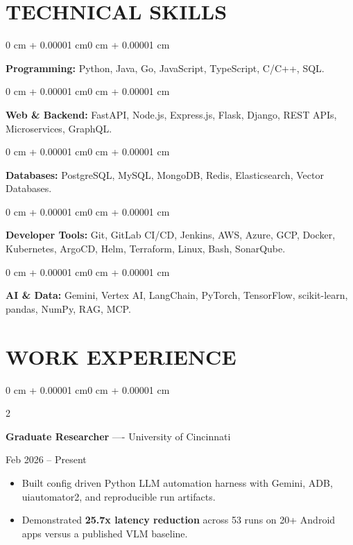 \documentclass[10pt, letterpaper]{article}
\newenvironment{highlights}{
    \begin{itemize}[
        topsep=0.10 cm,
        parsep=0.06 cm,
        partopsep=0pt,
        itemsep=0.06 cm,
        leftmargin=12pt
    ]
}{
    \end{itemize}
}
\newenvironment{onecolentry}{
    \begin{adjustwidth}{0 cm + 0.00001 cm}{0 cm + 0.00001 cm}
}{
    \end{adjustwidth}
}
\newenvironment{twocolentry}[2][]{
    \onecolentry
    \def\secondColumn{#2}
    \setcolumnwidth{\fill, 4.5 cm}
    \begin{paracol}{2}
}{
    \switchcolumn \raggedleft \secondColumn
    \end{paracol}
    \endonecolentry
}
\begin{document}
\section{TECHNICAL SKILLS}
\begin{onecolentry}
\textbf{Programming:} Python, Java, Go, JavaScript, TypeScript, C/C++, SQL.
\end{onecolentry}
\vspace{0.06 cm}
\begin{onecolentry}
\textbf{Web \& Backend:} FastAPI, Node.js, Express.js, Flask, Django, REST APIs, Microservices, GraphQL.
\end{onecolentry}
\vspace{0.06 cm}
\begin{onecolentry}
\textbf{Databases:} PostgreSQL, MySQL, MongoDB, Redis, Elasticsearch, Vector Databases.
\end{onecolentry}
\vspace{0.06 cm}
\begin{onecolentry}
\textbf{Developer Tools:} Git, GitLab CI/CD, Jenkins, AWS, Azure, GCP, Docker, Kubernetes, ArgoCD, Helm, Terraform, Linux, Bash, SonarQube.
\end{onecolentry}
\vspace{0.06 cm}
\begin{onecolentry}
\textbf{AI \& Data:} Gemini, Vertex AI, LangChain, PyTorch, TensorFlow, scikit-learn, pandas, NumPy, RAG, MCP.
\end{onecolentry}

\section{WORK EXPERIENCE}
\begin{twocolentry}{Feb 2026 -- Present}
\textbf{Graduate Researcher} ---- University of Cincinnati
\end{twocolentry}
\begin{highlights}
  \item Built config driven Python LLM automation harness with Gemini, ADB, uiautomator2, and reproducible run artifacts.
  \item Demonstrated \textbf{25.7x latency reduction} across 53 runs on 20+ Android apps versus a published VLM baseline.
\end{highlights}

\vspace{0.15 cm}
\end{document}
